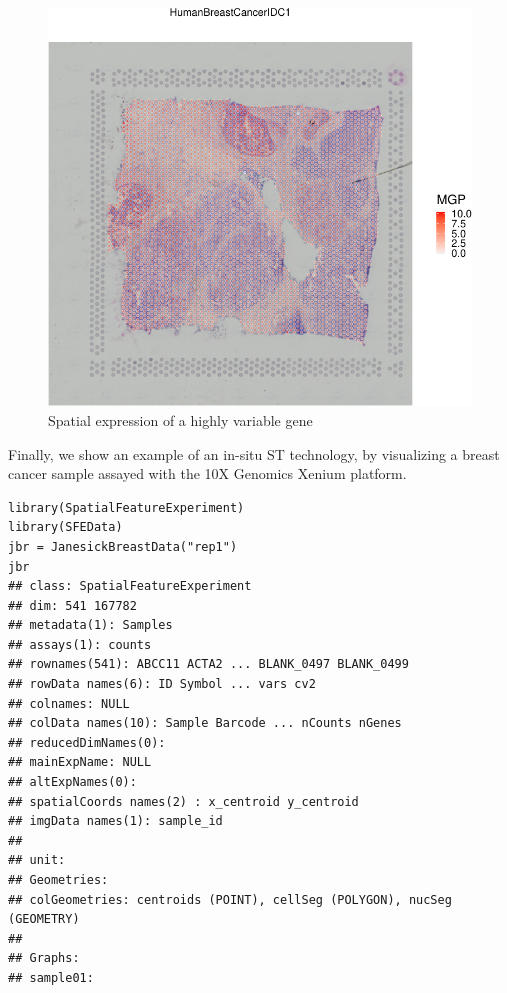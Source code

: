 \documentclass[graybox]{svmult}
\begin{document}
\begin{figure}
\includegraphics[width=1\linewidth,]{spatpdfs/plotvisium-1} \caption{Spatial expression of a highly variable gene}\label{fig:plotvisium}
\end{figure}

Finally, we show an example of an in-situ ST technology, by visualizing a breast
cancer sample assayed with the 10X Genomics Xenium platform.

\begin{shaded}
\begin{verbatim}
library(SpatialFeatureExperiment)
library(SFEData)
jbr = JanesickBreastData("rep1")
jbr
## class: SpatialFeatureExperiment
## dim: 541 167782
## metadata(1): Samples
## assays(1): counts
## rownames(541): ABCC11 ACTA2 ... BLANK_0497 BLANK_0499
## rowData names(6): ID Symbol ... vars cv2
## colnames: NULL
## colData names(10): Sample Barcode ... nCounts nGenes
## reducedDimNames(0):
## mainExpName: NULL
## altExpNames(0):
## spatialCoords names(2) : x_centroid y_centroid
## imgData names(1): sample_id
##
## unit:
## Geometries:
## colGeometries: centroids (POINT), cellSeg (POLYGON), nucSeg (GEOMETRY)
##
## Graphs:
## sample01:
\end{verbatim}
\end{shaded}
\end{document}
